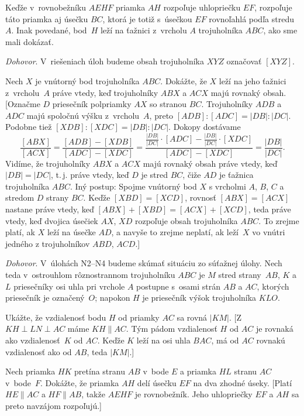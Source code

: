 {Keďže v~rovnobežníku $AEHF$ priamka $AH$ rozpoľuje uhlopriečku $EF$,
rozpoľuje táto priamka aj úsečku $BC$, ktorá je totiž s~úsečkou $EF$
rovnoľahlá podľa stredu $A$. Inak povedané, bod~$H$ leží na
ťažnici z~vrcholu $A$ trojuholníka $ABC$, ako sme mali dokázať.

{\everypar{}
\smallskip
\emph{Dohovor}. V~riešeniach úloh budeme obsah trojuholníka $XYZ$ označovať {$[XYZ]$}.
\smallskip
}

Nech $X$ je vnútorný bod trojuholníka $ABC$. Dokážte, že
$X$ leží na jeho ťažnici z~vrcholu~$A$ práve vtedy, keď trojuholníky
$ABX$ a $ACX$ majú rovnaký obsah.
[Označme $D$ priesečník polpriamky $AX$ so stranou $BC$.
Trojuholníky $ADB$ a $ADC$ majú spoločnú výšku z~vrcholu~$A$,
preto $[ADB]:[ADC]=|DB|:|DC|$. Podobne tiež
$[XDB]:[XDC] = |DB|:|DC|$. Dokopy dostávame
$$
\frac{[ABX]}{[ACX]} = \frac{[ADB]-[XDB]}{[ADC]-[XDC]} =
\frac{\frac{|DB|}{|DC|}\cdot[ADC] -
\frac{|DB|}{|DC|}\cdot[XDC]}{[ADC]-[XDC]} = \frac{|DB|}{|DC|}.
$$
Vidíme, že trojuholníky $ABX$ a $ACX$ majú rovnaký obsah práve vtedy, keď
$|DB| = |DC|$, t.\,j. práve vtedy, keď $D$ je stred $BC$, čiže
$AD$ je ťažnica trojuholníka $ABC$. Iný postup: Spojme vnútorný bod $X$
s vrcholmi $A$, $B$, $C$ a stredom $D$ strany $BC$. Keďže
$[XBD]=[XCD]$, rovnosť $[ABX]=[ACX]$ nastane práve vtedy, keď
$[ABX]+[XBD]=[ACX]+[XCD]$, teda práve vtedy, keď dvojica úsečiek
$AX$, $XD$ rozpoľuje obsah trojuholníka $ABC$. To zrejme platí, ak $X$
leží na úsečke $AD$, a navyše to zrejme neplatí, ak leží~$X$
vo vnútri jedného z trojuholníkov $ABD$, $ACD$.]

{\everypar{}
\smallskip
\emph{Dohovor}. V~úlohách N2--N4 budeme skúmať situáciu
zo súťažnej úlohy. Nech teda v~ostrouhlom
rôznostrannom trojuholníku $ABC$ je $M$ stred strany~$AB$,
$K$ a $L$ priesečníky osi uhla pri vrchole $A$ postupne
s~osami strán $AB$ a $AC$, ktorých priesečník je označený~$O$;
napokon $H$ je priesečník výšok trojuholníka $KLO$.
\smallskip
}

Ukážte, že vzdialenosť bodu $H$ od priamky $AC$ sa rovná $|KM|$.
[Z $KH\perp LN\perp AC$ máme $KH\parallel AC$. Tým pádom vzdialenosť
$H$ od $AC$ je rovnaká ako vzdialenosť~$K$ od $AC$. Keďže $K$
leží na osi uhla $BAC$, má od $AC$ rovnakú vzdialenosť ako od
$AB$, teda $|KM|$.]

Nech priamka $HK$ pretína stranu $AB$ v~bode $E$ a priamka
$HL$ stranu $AC$ v~bode~$F$. Dokážte, že priamka
$AH$ delí úsečku $EF$ na dva zhodné úseky.
[Platí $HE\parallel AC$ a $HF\parallel AB$, takže $AEHF$ je rovnobežník.
Jeho uhlopriečky $EF$ a $AH$ sa preto navzájom rozpoľujú.]

}
